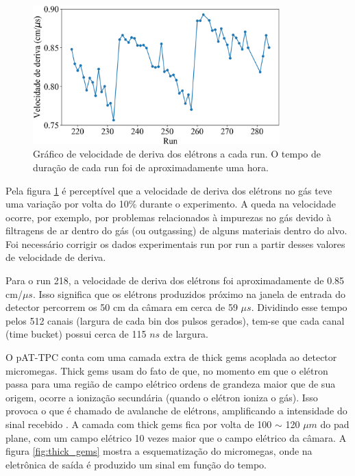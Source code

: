\documentclass[a4paper,12pt,oneside]{book}
\begin{document}
\begin{figure}[H]
    \centering
    \includegraphics[width=0.85\textwidth]{figs/vdrift_vs_run.png}
    \caption{Gráfico de velocidade de deriva dos elétrons a cada run. O tempo de duração de cada run foi de aproximadamente uma hora.}
    \label{fig:vdrif_vs_run}
\end{figure}

\par Pela figura \ref{fig:vdrif_vs_run} é perceptível que a velocidade de deriva dos elétrons no gás teve uma variação por volta do 10\% durante o experimento. A queda na velocidade ocorre, por exemplo, por problemas relacionados à impurezas no gás devido à filtragens de ar dentro do gás (ou outgassing) de alguns materiais dentro do alvo. Foi necessário corrigir os dados experimentais run por run a partir desses valores de velocidade de deriva.

\par Para o run 218, a velocidade de deriva dos elétrons foi aproximadamente de 0.85 cm/$\mu s$. Isso significa que os elétrons produzidos próximo na janela de entrada do detector percorrem os 50 cm da câmara em cerca de 59 $\mu s$. Dividindo esse tempo pelos 512 canais (largura de cada bin dos pulsos gerados), tem-se que cada canal (time bucket) possui cerca de 115 $ns$ de largura.

\par O pAT-TPC conta com uma camada extra de thick gems acoplada ao detector micromegas. Thick gems usam do fato de que, no momento em que o elétron passa para uma região de campo elétrico ordens de grandeza maior que de sua origem, ocorre a ionização secundária (quando o elétron ioniza o gás). Isso provoca o que é chamado de avalanche de elétrons, amplificando a intensidade do sinal recebido \cite{GET}. A camada com thick gems fica por volta de 100 $\sim$ 120 $\mu m$ do pad plane, com um campo elétrico 10 vezes maior que o campo elétrico da câmara. A figura \ref{fig:thick_gems} mostra a esquematização do micromegas, onde na eletrônica de saída é produzido um sinal em função do tempo.
\end{document}
